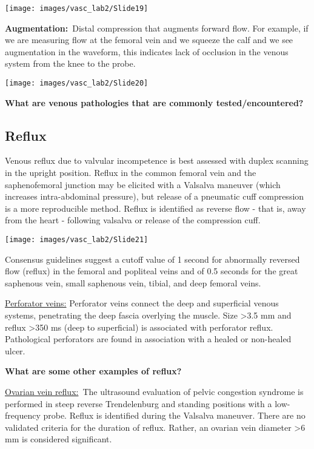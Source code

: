 \documentclass[
]{book}
\begin{document}
\texttt{[image: images/vasc\_lab2/Slide19]}

\textbf{Augmentation:}~Distal compression that augments forward flow. For
example, if we are measuring flow at the femoral vein and we squeeze the
calf and we see augmentation in the waveform, this indicates lack of
occlusion in the venous system from the knee to the probe.

\texttt{[image: images/vasc\_lab2/Slide20]}

\textbf{What are venous pathologies that are commonly tested/encountered?}

\hypertarget{reflux}{%
\subsection{Reflux}\label{reflux}}

Venous reflux due to valvular incompetence is best assessed with duplex
scanning in the upright position. Reflux in the common femoral vein and
the saphenofemoral junction may be elicited with a Valsalva maneuver
(which increases intra-abdominal pressure), but release of a pneumatic
cuff compression is a more reproducible method. Reflux is identified as
reverse flow - that is, away from the heart - following valsalva or
release of the compression cuff.

\texttt{[image: images/vasc\_lab2/Slide21]}

Consensus guidelines suggest a cutoff value of 1 second for abnormally
reversed flow (reflux) in the femoral and popliteal veins and of 0.5
seconds for the great saphenous vein, small saphenous vein, tibial, and
deep femoral veins.\citep{gloviczki2011, labropoulos2003}

\uline{Perforator veins:} Perforator veins connect the deep and
superficial venous systems, penetrating the deep fascia overlying the
muscle. Size \textgreater3.5 mm and reflux \textgreater350 ms (deep to superficial) is
associated with perforator reflux.\citep{min2003, odonnell2014, sandri1999}
Pathological perforators are found in association with a healed or
non-healed ulcer.

\textbf{What are some other examples of reflux?}

\uline{Ovarian vein reflux:}~The ultrasound evaluation of pelvic
congestion syndrome is performed in steep reverse Trendelenburg and
standing positions with a low-frequency probe. Reflux is identified
during the Valsalva maneuver. There are no validated criteria for the
duration of reflux. Rather, an ovarian vein diameter \textgreater6 mm is
considered significant.
\end{document}
